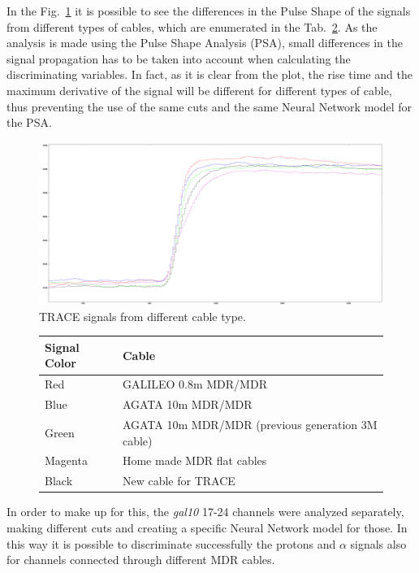 \bigbreak

In the Fig.~\ref{cable} it is possible to see the differences in the Pulse
Shape of the signals from different types of cables, which are enumerated in
the Tab.~\ref{cables}. As the analysis is made using the Pulse Shape Analysis
(PSA), small differences in the signal propagation has to be taken into
account when calculating the discriminating variables. In fact, as it is clear
from the plot, the rise time and the maximum derivative of the signal will be
different for different types of cable, thus preventing the use of the same
cuts and the same Neural Network model for the PSA.

\bigbreak

\begin{figure}[h]
  \centering
  \includegraphics[scale=.16]{img/cabling.png}
  \caption{TRACE signals from different cable type.}
  \label{cable}
\end{figure}

\begin{figure}
  \begin{tabular}{ll}
    Signal Color & Cable \\
    \midrule
    Red & GALILEO 0.8m MDR/MDR \\
    Blue & AGATA 10m MDR/MDR \\
    Green & AGATA 10m MDR/MDR (previous generation 3M cable) \\
    Magenta & Home made MDR flat cables \\
    Black & New cable for TRACE \\
    \bottomrule
  \end{tabular}
  \label{cables}
\end{figure}

\bigbreak

In order to make up for this, the \textit{gal10} 17-24 channels were analyzed
separately, making different cuts and creating a specific Neural Network model
for those. In this way it is possible to discriminate successfully the
protons and $\alpha$ signals also for channels connected through different MDR
cables.